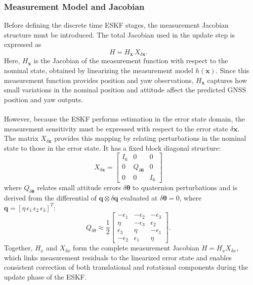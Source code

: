 \subsubsection{Measurement Model and Jacobian}
Before defining the discrete time ESKF stages, the measurement Jacobian structure must be introduced. The total Jacobian used in the update step is expressed as
$$
    H = H_{\mathbf{x}} \, X_{\delta \mathbf{x}}.
$$
Here, $H_{\mathbf{x}}$ is the Jacobian of the measurement function with respect to the nominal state, obtained by linearizing the measurement model $h(\mathbf{x})$. Since this measurement function provides position and yaw observations, $H_{\mathbf{x}}$ captures how small variations in the nominal position and attitude affect the predicted GNSS position and yaw outputs.  
\\ \\
However, because the ESKF performs estimation in the error state domain, the measurement sensitivity must be expressed with respect to the error state $\delta\mathbf{x}$. The matrix $X_{\delta \mathbf{x}}$ provides this mapping by relating perturbations in the nominal state to those in the error state. It has a fixed block diagonal structure:
$$
    X_{\delta \mathbf{x}} =
    \begin{bmatrix}
        I_6 & 0 & 0 \\
        0 & Q_{\delta\boldsymbol{\theta}} & 0 \\
        0 & 0 & I_6
    \end{bmatrix}
$$
where $Q_{\delta\boldsymbol{\theta}}$ relates small attitude errors $\delta\boldsymbol{\theta}$ to quaternion perturbations and is derived from the differential of $\mathbf{q} \otimes \delta\mathbf{q}$ evaluated at $\delta\boldsymbol{\theta}=0$, where $\mathbf{q} = [\eta \, \epsilon_1 \, \epsilon_2 \, \epsilon_3]^T$:
$$
    Q_{\delta\theta} \approx
    \frac{1}{2}
    \begin{bmatrix}
        -\epsilon_1 & -\epsilon_2 & -\epsilon_3 \\
         \eta & -\epsilon_3 & \epsilon_2 \\
         \epsilon_3 & \eta & -\epsilon_1 \\
        -\epsilon_2 & \epsilon_1 & \eta
    \end{bmatrix}.
$$
Together, $H_x$ and $X_{\delta x}$ form the complete measurement Jacobian $H = H_x X_{\delta x}$, which links measurement residuals to the linearized error state and enables consistent correction of both translational and rotational components during the update phase of the ESKF.



